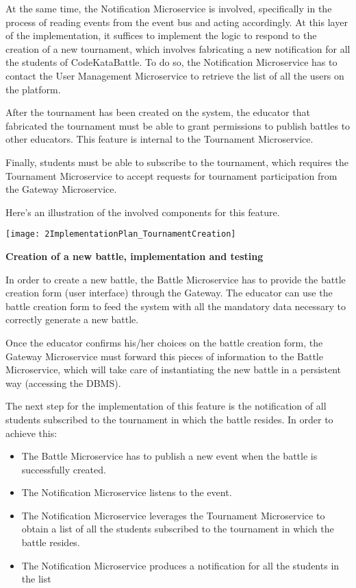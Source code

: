 At the same time, the Notification Microservice is involved, specifically in the process of reading events from the event bus and acting accordingly. At this layer of the implementation, it suffices to implement the logic to respond to the creation of a new tournament, which involves fabricating a new notification for all the students of CodeKataBattle. To do so, the Notification Microservice has to contact the User Management Microservice to retrieve the list of all the users on the platform.

After the tournament has been created on the system, the educator that fabricated the tournament must be able to grant permissions to publish battles to other educators. This feature is internal to the Tournament Microservice.

Finally, students must be able to subscribe to the tournament, which requires the Tournament Microservice to accept requests for tournament participation from the Gateway Microservice.

Here's an illustration of the involved components for this feature.



\begin{center}
	\texttt{[image: 2ImplementationPlan\_TournamentCreation]}
\end{center}


\vspace{0.7cm}

\textbf{Creation of a new battle, implementation and testing}

In order to create a new battle, the Battle Microservice has to provide the battle creation form (user interface) through the Gateway. The educator can use the battle creation form to feed the system with all the mandatory data necessary to correctly generate a new battle.

Once the educator confirms his/her choices on the battle creation form, the Gateway Microservice must forward this pieces of information to the Battle Microservice, which will take care of instantiating the new battle in a persistent way (accessing the DBMS).

The next step for the implementation of this feature is the notification of all students subscribed to the tournament in which the battle resides. In order to achieve this:
\begin{itemize}
	\item The Battle Microservice has to publish a new event when the battle is successfully created.
	\item The Notification Microservice listens to the event.
	\item The Notification Microservice leverages the Tournament Microservice to obtain a list of all the students subscribed to the tournament in which the battle resides.
	\item The Notification Microservice produces a notification for all the students in the list
\end{itemize}

